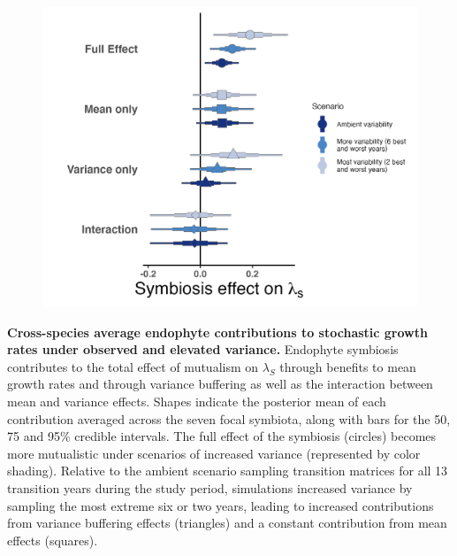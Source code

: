 \documentclass[12pt]{article}
\begin{document}
\begin{figure}
	\centering
	\includegraphics[width=.8\linewidth]{StochDemo_fig4.png}
\end{figure}
 \textbf{Cross-species average endophyte contributions to stochastic growth rates under observed and elevated variance.} Endophyte symbiosis contributes to the total effect of mutualism on $\lambda_{S}$ through benefits to mean growth rates and through variance buffering as well as the interaction between mean and variance effects. Shapes indicate the posterior mean of each contribution averaged across the seven focal symbiota, along with bars for the 50, 75 and 95\% credible intervals.  The full effect of the symbiosis (circles) becomes more mutualistic under scenarios of increased variance (represented by color shading). Relative to the ambient scenario sampling transition matrices for all 13 transition years during the study period, simulations increased variance by sampling the most extreme six or two years, leading to increased contributions from variance buffering effects (triangles) and a constant contribution from mean effects (squares).
\newpage
\end{document}
